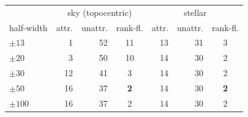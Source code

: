 \begin{tabular}{@{}l@{~~}rrc@{~~}rrc@{}}
\hline
& \multicolumn{3}{c}{sky (topocentric)} & \multicolumn{3}{c}{stellar} \\
half-width & attr. & unattr. & rank-fl. & attr. & unattr. & rank-fl. \\
\hline
$\pm13$ & 1 & 52 & 11 & 13 & 31 & 3 \\
$\pm20$ & 3 & 50 & 10 & 14 & 30 & 2 \\
$\pm30$ & 12 & 41 & 3 & 14 & 30 & 2 \\
\textbf{$\pm50$} & 16 & 37 & \textbf{2} & 14 & 30 & \textbf{2} \\
$\pm100$ & 16 & 37 & 2 & 14 & 30 & 2 \\
\hline
\end{tabular}
